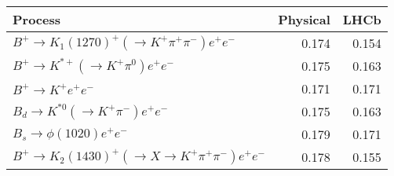 \begin{tabular}{lrr}
\toprule
Process & Physical & LHCb \\
\midrule
$B^+\to K_1(1270)^+(\to K^+\pi^+\pi^-)e^+e^-$ & 0.174 & 0.154 \\
$B^+\to K^{*+}(\to K^+\pi^0)e^+e^-$ & 0.175 & 0.163 \\
$B^+\to K^+e^+e^-$ & 0.171 & 0.171 \\
$B_d\to K^{*0}(\to K^+\pi^-)e^+e^-$ & 0.175 & 0.163 \\
$B_s\to \phi(1020)e^+e^-$ & 0.179 & 0.171 \\
$B^+\to K_2(1430)^+(\to X \to K^+\pi^+\pi^-)e^+e^-$ & 0.178 & 0.155 \\
\bottomrule
\end{tabular}
